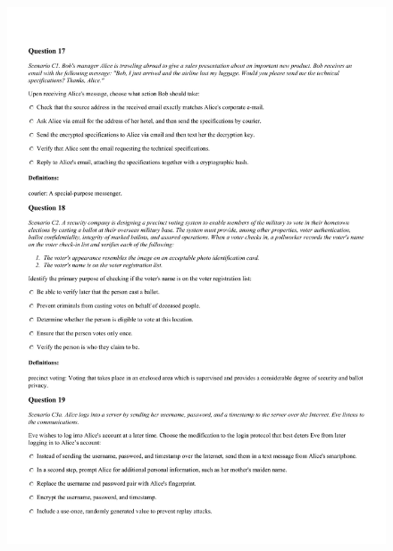 \begin{figure}[!h]
    \begin{center}
    \advance\leftskip-3cm
    \advance\rightskip-3cm
    \includegraphics[scale=.25]{images/exam/correctly_formated_exam-08.jpg}
    \label{fig:correctly_formated_exam-08}
\end{center}
\end{figure}

